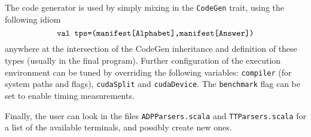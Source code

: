 The code generator is used by simply mixing in the {\tt CodeGen} trait, using the following idiom
	\[\text{\tt val tps=(manifest[Alphabet],manifest[Answer])}\]
anywhere at the intersection of the CodeGen inheritance and definition of these types (usually in the final program). Further configuration of the execution environment can be tuned by overriding the following variables: {\tt compiler} (for system paths and flags), {\tt cudaSplit} and {\tt cudaDevice}. The {\tt benchmark} flag can be set to enable timing measurements.

Finally, the user can look in the files {\tt ADPParsers.scala} and {\tt TTParsers.scala} for a list of the available terminals, and possibly create new ones.
